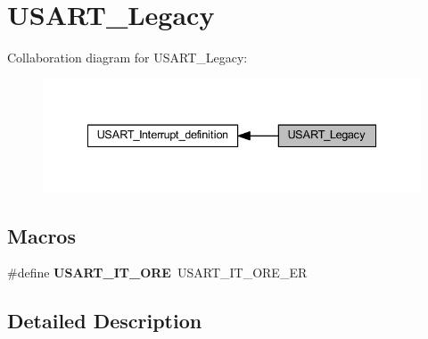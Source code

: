 \hypertarget{group___u_s_a_r_t___legacy}{}\section{U\+S\+A\+R\+T\+\_\+\+Legacy}
\label{group___u_s_a_r_t___legacy}
Collaboration diagram for U\+S\+A\+R\+T\+\_\+\+Legacy\+:\nopagebreak
\begin{figure}[H]
\begin{center}
\leavevmode
\includegraphics[width=335pt]{group___u_s_a_r_t___legacy}
\end{center}
\end{figure}
\subsection*{Macros}
\begin{DoxyCompactItemize}
\item 
\mbox{\label{group___u_s_a_r_t___legacy_ga8b7d40e02a81be787fbb325bbe6dfbeb}} 
\#define {\bfseries U\+S\+A\+R\+T\+\_\+\+I\+T\+\_\+\+O\+RE}~U\+S\+A\+R\+T\+\_\+\+I\+T\+\_\+\+O\+R\+E\+\_\+\+ER
\end{DoxyCompactItemize}


\subsection{Detailed Description}
